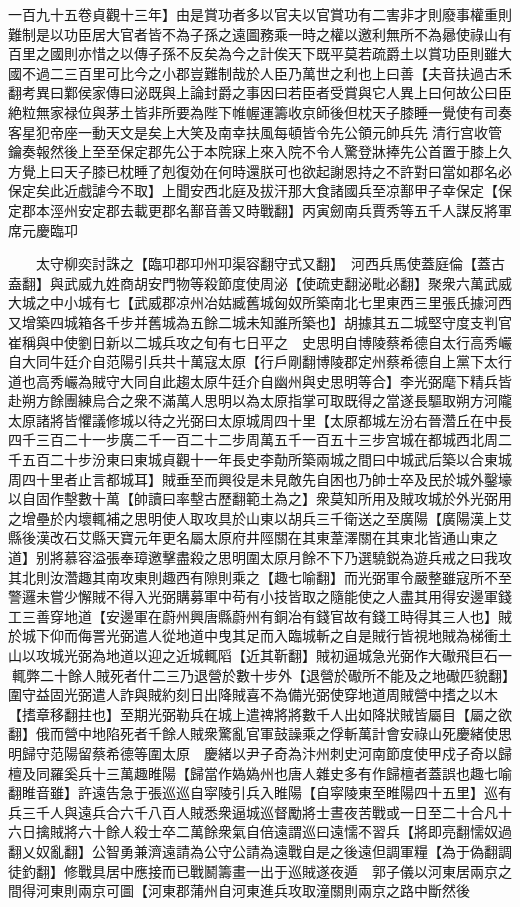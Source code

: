 一百九十五卷貞觀十三年】由是賞功者多以官夫以官賞功有二害非才則廢事權重則難制是以功臣居大官者皆不為子孫之遠圖務乘一時之權以邀利無所不為曏使祿山有百里之國則亦惜之以傳子孫不反矣為今之計俟天下既平莫若疏爵土以賞功臣則雖大國不過二三百里可比今之小郡豈難制哉於人臣乃萬世之利也上曰善【夫音扶過古禾翻考異曰鄴侯家傳曰泌既與上論封爵之事因曰若臣者受賞與它人異上曰何故公曰臣絶粒無家禄位與茅土皆非所要為陛下帷幄運籌收京師後但枕天子膝睡一覺使有司奏客星犯帝座一動天文是矣上大笑及南幸扶風每頓皆令先公領元帥兵先清行宫收管鑰奏報然後上至至保定郡先公于本院寐上來入院不令人驚登牀捧先公首置于膝上久方覺上曰天子膝已枕睡了剋復効在何時還朕可也欲起謝恩持之不許對曰當如郡名必保定矣此近戲謔今不取】上聞安西北庭及拔汗那大食諸國兵至凉鄯甲子幸保定【保定郡本涇州安定郡去載更郡名鄯音善又時戰翻】丙寅劒南兵賈秀等五千人謀反將軍席元慶臨卭

　　太守柳奕討誅之【臨卭郡卭州卭渠容翻守式又翻】　河西兵馬使蓋庭倫【蓋古盍翻】與武威九姓商胡安門物等殺節度使周泌【使疏吏翻泌毗必翻】聚衆六萬武威大城之中小城有七【武威郡凉州冶姑臧舊城匈奴所築南北七里東西三里張氏據河西又增築四城箱各千步并舊城為五餘二城未知誰所築也】胡據其五二城堅守度支判官崔稱與中使劉日新以二城兵攻之旬有七日平之　史思明自博陵蔡希德自太行高秀巗自大同牛廷介自范陽引兵共十萬寇太原【行戶剛翻博陵郡定州蔡希德自上黨下太行道也高秀巗為賊守大同自此趨太原牛廷介自幽州與史思明等合】李光弼麾下精兵皆赴朔方餘團練烏合之衆不滿萬人思明以為太原指掌可取既得之當遂長驅取朔方河隴太原諸將皆懼議修城以待之光弼曰太原城周四十里【太原都城左汾右晉濳丘在中長四千三百二十一步廣二千一百二十二步周萬五千一百五十三步宫城在都城西北周二千五百二十步汾東曰東城貞觀十一年長史李勣所築兩城之間曰中城武后築以合東城周四十里者止言都城耳】賊垂至而興役是未見敵先自困也乃帥士卒及民於城外鑿壕以自固作墼數十萬【帥讀曰率墼古歷翻範土為之】衆莫知所用及賊攻城於外光弼用之增壘於内壞輒補之思明使人取攻具於山東以胡兵三千衛送之至廣陽【廣陽漢上艾縣後漢改石艾縣天寶元年更名屬太原府井陘關在其東葦澤關在其東北皆通山東之道】别將慕容溢張奉璋邀擊盡殺之思明圍太原月餘不下乃選驍鋭為遊兵戒之曰我攻其北則汝濳趣其南攻東則趣西有隙則乘之【趣七喻翻】而光弼軍令嚴整雖寇所不至警邏未嘗少懈賊不得入光弼購募軍中苟有小技皆取之隨能使之人盡其用得安邊軍錢工三善穿地道【安邊軍在蔚州興唐縣蔚州有銅冶有錢官故有錢工時得其三人也】賊於城下仰而侮詈光弼遣人從地道中曳其足而入臨城斬之自是賊行皆視地賊為梯衝土山以攻城光弼為地道以迎之近城輒䧟【近其靳翻】賊初逼城急光弼作大礮飛巨石一輒弊二十餘人賊死者什二三乃退營於數十步外【退營於礮所不能及之地礮匹貌翻】圍守益固光弼遣人詐與賊約刻日出降賊喜不為備光弼使穿地道周賊營中搘之以木【搘章移翻拄也】至期光弼勒兵在城上遣禆將將數千人出如降狀賊皆屬目【屬之欲翻】俄而營中地陷死者千餘人賊衆驚亂官軍鼓譟乘之俘斬萬計會安祿山死慶緒使思明歸守范陽留蔡希德等圍太原　慶緒以尹子奇為汴州刺史河南節度使甲戍子奇以歸檀及同羅奚兵十三萬趣睢陽【歸當作媯媯州也唐人雜史多有作歸檀者蓋誤也趣七喻翻睢音雖】許遠告急于張巡巡自寜陵引兵入睢陽【自寜陵東至睢陽四十五里】巡有兵三千人與遠兵合六千八百人賊悉衆逼城巡督勵將士晝夜苦戰或一日至二十合凡十六日擒賊將六十餘人殺士卒二萬餘衆氣自倍遠謂巡曰遠懦不習兵【將即亮翻懦奴過翻乂奴亂翻】公智勇兼濟遠請為公守公請為遠戰自是之後遠但調軍糧【為于偽翻調徒釣翻】修戰具居中應接而已戰鬭籌畫一出于巡賊遂夜遁　郭子儀以河東居兩京之間得河東則兩京可圖【河東郡蒲州自河東進兵攻取潼關則兩京之路中斷然後